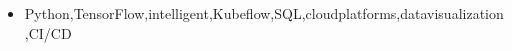 \documentclass[a4paper,10pt]{article}
\begin{document}
\begin{multicols}{2}

\begin{itemize}[leftmargin=*]

\item Python,TensorFlow,intelligent,Kubeflow,SQL,cloudplatforms,datavisualization,CI/CD

\end{itemize}

\end{multicols}
\end{document}
